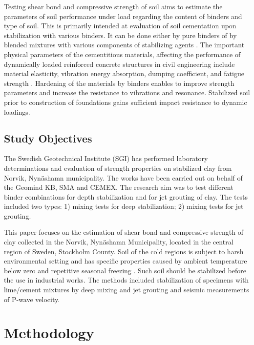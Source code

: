 \documentclass[USenglish,twocolumn]{article}
\begin{document}
Testing shear bond and compressive strength of soil aims to estimate the parameters of soil performance under load regarding the content of binders and type of soil. This is primarily intended at evaluation of soil cementation upon stabilization with various binders. It can be done either by pure binders of by blended mixtures with various components of stabilizing agents \citep{HOV2022101162,Bakaiyang}. The important physical parameters of the cementitious materials, affecting the performance of dynamically loaded reinforced concrete structures in civil engineering include material elasticity, vibration energy absorption, dumping coefficient, and fatigue strength \cite{Golewski2019}. Hardening of the materials by binders enables to improve strength parameters and increase the resistance to vibrations and resonance. Stabilized soil prior to construction of foundations gains sufficient impact resistance to dynamic loadings.

\subsection{Study Objectives}

The Swedish Geotechnical Institute (SGI) has performed laboratory determinations and evaluation of strength properties on stabilized clay from Norvik, Nynäshamn municipality. The works have been carried out on behalf of the Geomind KB, SMA and CEMEX. The research aim was to test different binder combinations for depth stabilization and for jet grouting of clay. The tests included two types: 1) mixing tests for deep stabilization; 2) mixing tests for jet grouting. 

This paper focuses on the estimation of shear bond and compressive strength of clay collected in the Norvik, Nynäshamn Municipality, located in the central region of Sweden, Stockholm County. Soil of the cold regions is subject to harsh environmental setting and has specific properties caused by ambient temperature below zero and repetitive seasonal freezing \cite{LindhWinter,Lemenkov2021b,Lemenkov2021a,Sato}. Such soil should be stabilized before the use in industrial works. The methods included stabilization of specimens with lime/cement mixtures by deep mixing and jet grouting and seismic measurements of P-wave velocity. 


\section{Methodology}
\end{document}
